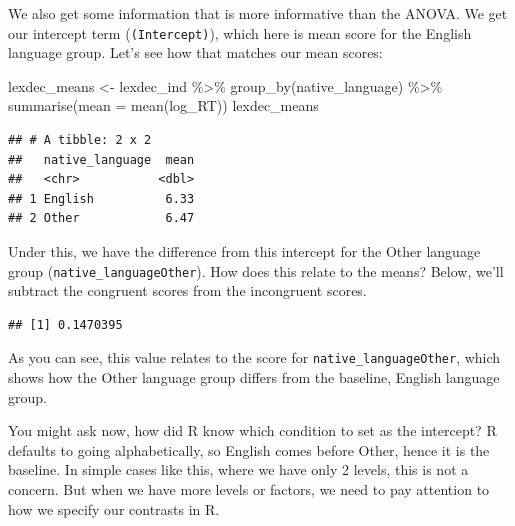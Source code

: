 \documentclass[
]{book}
\newenvironment{Shaded}{\begin{snugshade}}{\end{snugshade}}
\newcommand{\AttributeTok}[1]{\textcolor[rgb]{0.77,0.63,0.00}{#1}}
\newcommand{\DecValTok}[1]{\textcolor[rgb]{0.00,0.00,0.81}{#1}}
\newcommand{\FunctionTok}[1]{\textcolor[rgb]{0.00,0.00,0.00}{#1}}
\newcommand{\NormalTok}[1]{#1}
\newcommand{\OtherTok}[1]{\textcolor[rgb]{0.56,0.35,0.01}{#1}}
\newcommand{\SpecialCharTok}[1]{\textcolor[rgb]{0.00,0.00,0.00}{#1}}
\begin{document}
We also get some information that is more informative than the ANOVA. We get our intercept term (\texttt{(Intercept)}), which here is mean score for the English language group. Let's see how that matches our mean scores:

\begin{Shaded}
\begin{Highlighting}[]
\NormalTok{lexdec\_means }\OtherTok{\textless{}{-}}\NormalTok{ lexdec\_ind }\SpecialCharTok{\%\textgreater{}\%} 
  \FunctionTok{group\_by}\NormalTok{(native\_language) }\SpecialCharTok{\%\textgreater{}\%} 
  \FunctionTok{summarise}\NormalTok{(}\AttributeTok{mean =} \FunctionTok{mean}\NormalTok{(log\_RT))}
\NormalTok{lexdec\_means}
\end{Highlighting}
\end{Shaded}

\begin{verbatim}
## # A tibble: 2 x 2
##   native_language  mean
##   <chr>           <dbl>
## 1 English          6.33
## 2 Other            6.47
\end{verbatim}

Under this, we have the difference from this intercept for the Other language group (\texttt{native\_languageOther}). How does this relate to the means? Below, we'll subtract the congruent scores from the incongruent scores.

\begin{Shaded}
\end{Shaded}

\begin{verbatim}
## [1] 0.1470395
\end{verbatim}

As you can see, this value relates to the score for \texttt{native\_languageOther}, which shows how the Other language group differs from the baseline, English language group.

You might ask now, how did R know which condition to set as the intercept? R defaults to going alphabetically, so English comes before Other, hence it is the baseline. In simple cases like this, where we have only 2 levels, this is not a concern. But when we have more levels or factors, we need to pay attention to how we specify our contrasts in R.
\end{document}
